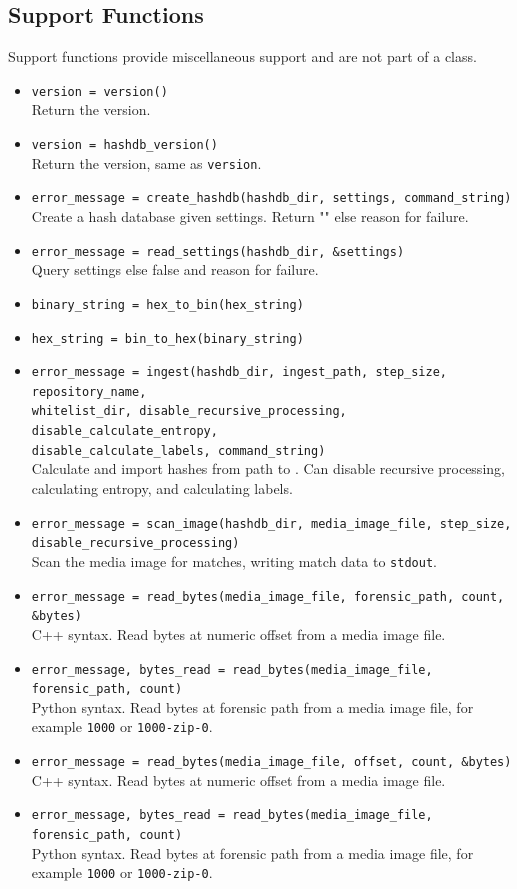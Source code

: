 \documentclass[11pt,fleqn]{article} %
\begin{document}
\subsection{Support Functions}
Support functions provide miscellaneous support and are not part of a class.
\begin{itemize}
\item \verb+version = version()+\\
Return the \hdb version.
\item \verb+version = hashdb_version()+\\
Return the \hdb version, same as \verb+version+.
\item \verb+error_message = create_hashdb(hashdb_dir, settings, command_string)+\\
Create a hash database given settings. Return "" else reason for failure.
\item \verb+error_message = read_settings(hashdb_dir, &settings)+\\
Query settings else false and reason for failure.
\item \verb+binary_string = hex_to_bin(hex_string)+
\item \verb+hex_string = bin_to_hex(binary_string)+
\item \verb+error_message = ingest(hashdb_dir, ingest_path, step_size, repository_name,+\\
\verb+whitelist_dir, disable_recursive_processing, disable_calculate_entropy,+\\
\verb+disable_calculate_labels, command_string)+\\
Calculate and import hashes from path to \hdb. Can disable recursive processing, calculating entropy, and calculating labels.
\item \verb+error_message = scan_image(hashdb_dir, media_image_file, step_size,+\\
\verb+disable_recursive_processing)+\\
Scan the media image for matches, writing match data to \verb+stdout+.
\item \verb+error_message = read_bytes(media_image_file, forensic_path, count, &bytes)+\\
C++ syntax.  Read bytes at numeric offset from a media image file.
\item \verb+error_message, bytes_read = read_bytes(media_image_file, forensic_path, count)+\\
Python syntax. Read bytes at forensic path from a media image file, for example \verb+1000+ or \verb+1000-zip-0+.
\item \verb+error_message = read_bytes(media_image_file, offset, count, &bytes)+\\
C++ syntax.  Read bytes at numeric offset from a media image file.
\item \verb+error_message, bytes_read = read_bytes(media_image_file, forensic_path, count)+\\
Python syntax. Read bytes at forensic path from a media image file, for example \verb+1000+ or \verb+1000-zip-0+.
\end{itemize}
\end{document}
